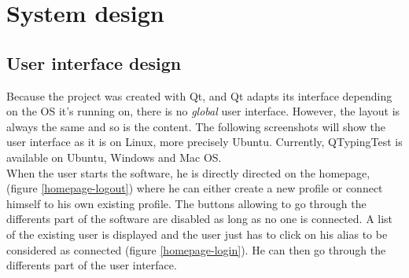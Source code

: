 \part{System design}
\chapter{User interface design}
Because the project was created with Qt, and Qt adapts its interface depending on the OS it's running on, there is no \textit{global} user interface. However, the layout is always the same and so is the content. The following screenshots will show the user interface as it is on Linux, more precisely Ubuntu. Currently, QTypingTest is available on Ubuntu, Windows and Mac OS.\\
When the user starts the software, he is directly directed on the homepage, (figure \ref{homepage-logout}) where he can either create a new profile or connect himself to his own existing profile. The buttons allowing to go through the differents part of the software are disabled as long as no one is connected. A list of the existing user is displayed and the user just has to click on his alias to be considered as connected (figure \ref{homepage-login}). He can then go through the differents part of the user interface. 
